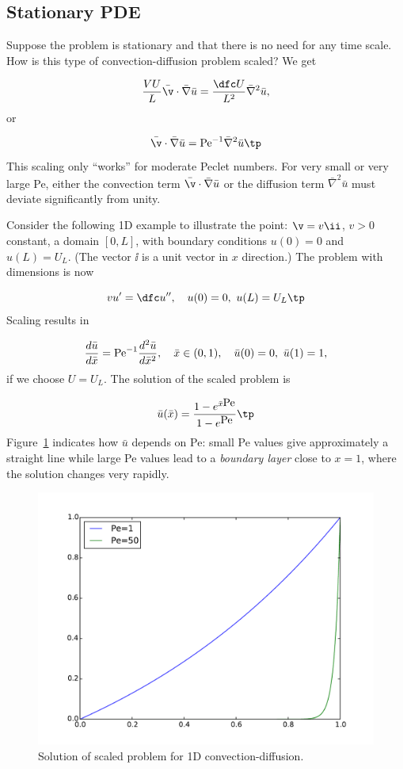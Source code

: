 \documentclass[graybox,envcountchap,sectrefs,final]{svmonodo}
\begin{document}
\subsection{Stationary PDE}

Suppose the problem is stationary and that there is no need for
any time scale. How is this type of convection-diffusion problem
scaled? We get

\[
\frac{VU}{L}\bar\v\cdot\bar\nabla\bar u =
\frac{\dfc U}{L^2}\bar\nabla^2\bar u,
\]
or

\begin{equation}
\bar\v\cdot\bar\nabla\bar u =
\hbox{Pe}^{-1}\bar\nabla^2\bar u\tp
\label{scale:convdiff:pde1:d3}
\end{equation}
This scaling only ``works'' for moderate Peclet numbers. For very small or
very large Pe, either the convection term $\bar\v\cdot\bar\nabla\bar u$
or the diffusion term $\bar\nabla^2\bar u$ must deviate significantly
from unity.

Consider the following 1D example to illustrate the point: $\v = v\ii$,
$v>0$ constant, a domain $[0,L]$, with boundary conditions $u(0)=0$ and
$u(L)=U_L$. (The vector $\ii$ is a unit vector in $x$ direction.)
The problem with dimensions is now

\[ vu^{\prime} = \dfc u^{\prime\prime},\quad u(0)=0,\ u(L)=U_L\tp\]
Scaling results in

\[ \frac{d\bar u}{d\bar x} = \hbox{Pe}^{-1}\frac{d^2\bar u}{d\bar x^2},\quad
\bar x\in (0,1),\quad \bar u(0)=0,\ \bar u(1) = 1,\]
if we choose $U=U_L$. The solution of the scaled problem is

\[ \bar u(\bar x) = \frac{1 - e^{\bar x\hbox{Pe}}}{1 - e^{\hbox{Pe}}}\tp\]
Figure~\ref{scale:convdiff:fig:scaled} indicates how $\bar u$ depends on
Pe: small Pe values give approximately a straight line while large Pe
values lead to a \emph{boundary layer} close to $x=1$, where the solution
changes very rapidly.


\begin{figure}[!ht]  %
  \centerline{\includegraphics[width=0.9\linewidth]{fig-scaling/boundary_layer1D.pdf}}
  \caption{
  Solution of scaled problem for 1D convection-diffusion. \label{scale:convdiff:fig:scaled}
  }
\end{figure}
\end{document}
